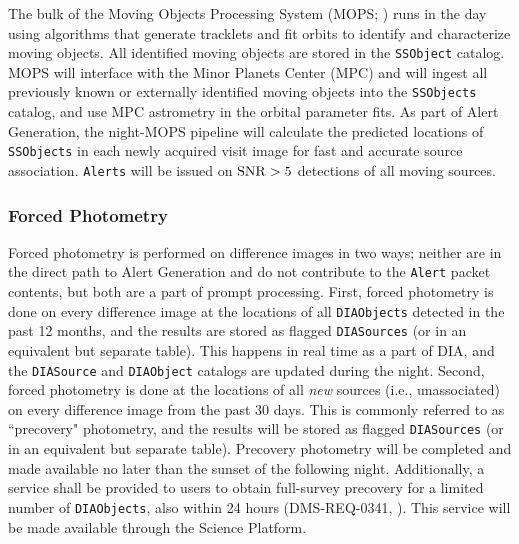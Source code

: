 The bulk of the Moving Objects Processing System (MOPS; ) runs in the day using algorithms that generate tracklets and fit orbits to identify and characterize moving objects. All identified moving objects are stored in the {\tt SSObject} catalog. MOPS will interface with the Minor Planets Center (MPC) and will ingest all previously known or externally identified moving objects into the {\tt SSObjects} catalog, and use MPC astrometry in the orbital parameter fits. As part of Alert Generation, the night-MOPS pipeline will calculate the predicted locations of {\tt SSObjects} in each newly acquired visit image for fast and accurate source association. {\tt Alerts} will be issued on ${\rm SNR} > 5$ detections of all moving sources.

\subsubsection{Forced Photometry}\label{sssec:AGP_force}

Forced photometry is performed on difference images in two ways; neither are in the direct path to Alert Generation and do not contribute to the {\tt Alert} packet contents, but both are a part of prompt processing. First, forced photometry is done on every difference image at the locations of all {\tt DIAObjects} detected in the past 12 months, and the results are stored as flagged {\tt DIASources} (or in an equivalent but separate table). This happens in real time as a part of DIA, and the {\tt DIASource} and {\tt DIAObject} catalogs are updated during the night. Second, forced photometry is done at the locations of all {\em new} sources (i.e., unassociated) on every difference image from the past 30 days. This is commonly referred to as ``precovery" photometry, and the results will be stored as flagged {\tt DIASources} (or in an equivalent but separate table). Precovery photometry will be completed and made available no later than the sunset of the following night.
Additionally, a service shall be provided to users to obtain full-survey precovery for a limited number of {\tt DIAObjects}, also within 24 hours (DMS-REQ-0341, ). This service will be made available through the Science Platform.


